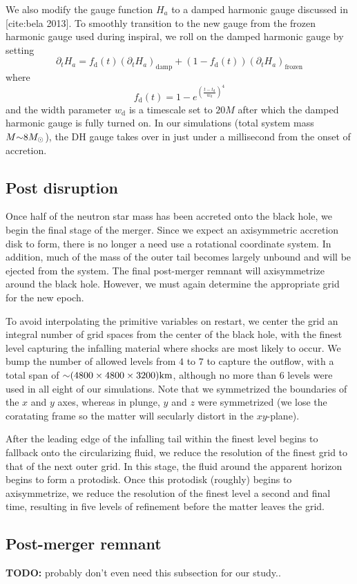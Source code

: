 We also modify the gauge function $H_a$ to a damped harmonic gauge discussed in [cite:bela 2013].  To smoothly transition to the new gauge from the frozen harmonic gauge used during inspiral, we roll on the damped harmonic gauge by setting
\begin{equation}
\partial_t H_a = f_\textrm{d}(t) (\partial_t H_a)_\textrm{damp} + (1 - f_\textrm{d}(t)) (\partial_t H_a)_\textrm{frozen}
\end{equation}
where 
\begin{equation}
f_\textrm{d}(t) = 1 - e^{ \left(\frac{t-t_\textrm{d}}{w_\textrm{d}} \right)^4 }
\end{equation}
and the width parameter $w_\textrm{d}$ is a timescale set to $20 M$ after which the damped harmonic gauge is fully turned on.  In our simulations (total system mass $M \mathord{\sim} 8 M_\odot$), the DH gauge takes over in just under a millisecond from the onset of accretion.


\subsection{Post disruption}

Once half of the neutron star mass has been accreted onto the black hole, we begin the final stage of the merger.  
Since we expect an axisymmetric accretion disk to form, there is no longer a need use a rotational coordinate system.
In addition, much of the mass of the outer tail becomes largely unbound and will be ejected from the system.  
The final post-merger remnant will axisymmetrize around the black hole.
However, we must again determine the appropriate grid for the new epoch.

To avoid interpolating the primitive variables on restart, we center the grid an integral number of grid spaces from the center of the black hole, with the finest level capturing the infalling material where shocks are most likely to occur.  
We bump the number of allowed levels from $4$ to $7$ to capture the outflow, with a total span of $\mathord{\sim}(4800 \times 4800 \times 3200) \textrm{km}$, although no more than $6$ levels were used in all eight of our simulations.
Note that we symmetrized the boundaries of the $x$ and $y$ axes, whereas in plunge, $y$ and $z$ were symmetrized (we lose the coratating frame so the matter will secularly distort in the $xy$-plane).    

After the leading edge of the infalling tail within the finest level begins to fallback onto the circularizing fluid, we reduce the resolution of the finest grid to that of the next outer grid. 
In this stage, the fluid around the apparent horizon begins to form a protodisk.
Once this protodisk (roughly) begins to axisymmetrize, we reduce the resolution of the finest level a second and final time, resulting in five levels of refinement before the matter leaves the grid.

\subsection{Post-merger remnant}

\textbf{TODO:} probably don't even need this subsection for our study..










